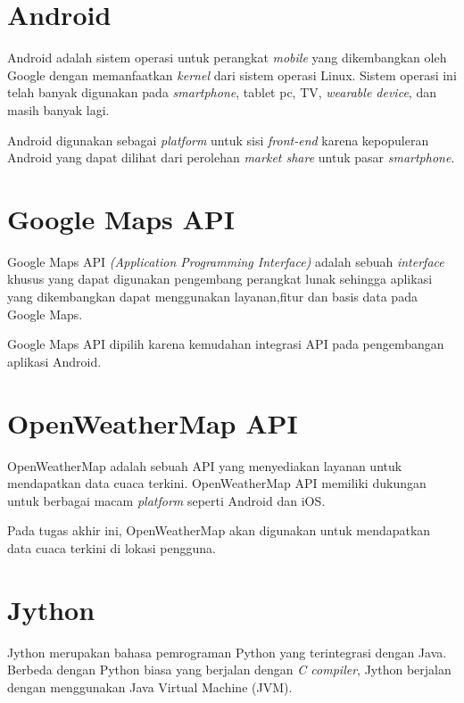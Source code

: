 \section{Android}
Android adalah sistem operasi untuk perangkat \textit{mobile} yang dikembangkan oleh Google dengan memanfaatkan \textit{kernel} dari sistem operasi Linux. Sistem operasi ini telah banyak digunakan pada \textit{smartphone}, tablet pc, TV, \textit{wearable device}, dan masih banyak lagi.

Android digunakan sebagai \textit{platform} untuk sisi \textit{front-end} karena kepopuleran Android yang dapat dilihat dari perolehan \textit{market share} untuk pasar \textit{smartphone}\cite{androidmarket}.

\section{Google Maps API}
Google Maps API \textit{(Application Programming Interface)} adalah sebuah \textit{interface} khusus yang dapat digunakan pengembang perangkat lunak sehingga aplikasi yang dikembangkan dapat menggunakan layanan,fitur dan basis data pada Google Maps.
\par
Google Maps API dipilih karena kemudahan integrasi API pada pengembangan aplikasi Android.  

\section{OpenWeatherMap API}
OpenWeatherMap adalah sebuah API yang menyediakan layanan untuk mendapatkan data cuaca terkini. OpenWeatherMap API memiliki dukungan untuk berbagai macam \textit{platform} seperti Android dan iOS.
\par
Pada tugas akhir ini, OpenWeatherMap akan digunakan untuk mendapatkan data cuaca terkini di lokasi pengguna.

\section{Jython}
Jython merupakan bahasa pemrograman Python yang terintegrasi dengan Java. Berbeda dengan Python biasa yang berjalan dengan \textit{C compiler}, Jython berjalan dengan menggunakan
Java Virtual Machine (JVM). 

